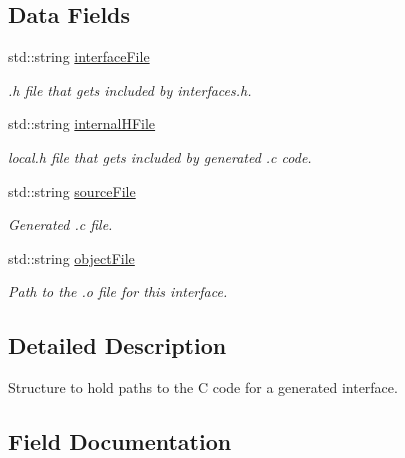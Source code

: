 \subsection*{Data Fields}
\begin{DoxyCompactItemize}
\item 
std\+::string \hyperlink{structmodel_1_1_interface_c_files__t_af2cb2ed30a32cfa8465455ca41b1f33c}{interface\+File}
\begin{DoxyCompactList}\small\item\em .h file that gets included by interfaces.\+h. \end{DoxyCompactList}\item 
std\+::string \hyperlink{structmodel_1_1_interface_c_files__t_a744e7b0e5c916fa842fb405289008cea}{internal\+H\+File}
\begin{DoxyCompactList}\small\item\em local.\+h file that gets included by generated .c code. \end{DoxyCompactList}\item 
std\+::string \hyperlink{structmodel_1_1_interface_c_files__t_a1fa26aa1b6063489544054469bda9fe5}{source\+File}
\begin{DoxyCompactList}\small\item\em Generated .c file. \end{DoxyCompactList}\item 
std\+::string \hyperlink{structmodel_1_1_interface_c_files__t_ac0a73d1804bbb3fdba88eac037f48538}{object\+File}
\begin{DoxyCompactList}\small\item\em Path to the .o file for this interface. \end{DoxyCompactList}\end{DoxyCompactItemize}


\subsection{Detailed Description}
Structure to hold paths to the C code for a generated interface. 

\subsection{Field Documentation}
